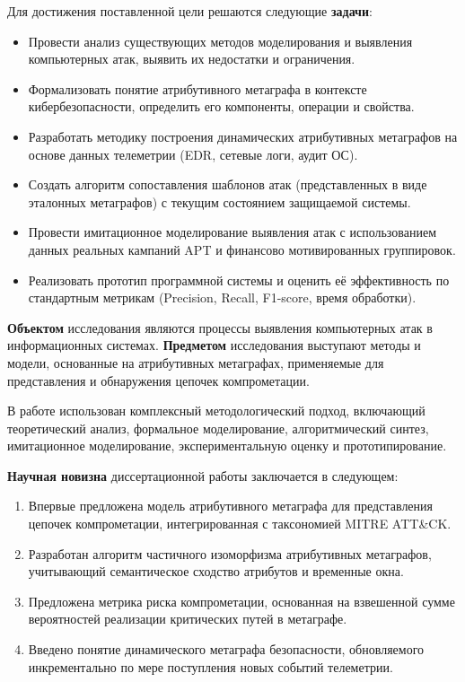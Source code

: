 Для достижения поставленной цели решаются следующие \textbf{задачи}:
\begin{itemize}
\item Провести анализ существующих методов моделирования и выявления компьютерных атак, выявить их недостатки и ограничения.
    \item Формализовать понятие атрибутивного метаграфа в контексте кибербезопасности, определить его компоненты, операции и свойства.
    \item Разработать методику построения динамических атрибутивных метаграфов на основе данных телеметрии (EDR, сетевые логи, аудит ОС).
    \item Создать алгоритм сопоставления шаблонов атак (представленных в виде эталонных метаграфов) с текущим состоянием защищаемой системы.
    \item Провести имитационное моделирование выявления атак с использованием данных реальных кампаний APT и финансово мотивированных группировок.
    \item Реализовать прототип программной системы и оценить её эффективность по стандартным метрикам (Precision, Recall, F1-score, время обработки).
\end{itemize}
\textbf{Объектом} исследования являются процессы выявления компьютерных атак в информационных системах.  
\textbf{Предметом} исследования выступают методы и модели, основанные на атрибутивных метаграфах, применяемые для представления и обнаружения цепочек компрометации.

В работе использован комплексный методологический подход, включающий теоретический анализ, формальное моделирование, алгоритмический синтез, имитационное моделирование, экспериментальную оценку и прототипирование.

\textbf{Научная новизна} диссертационной работы заключается в следующем:
\begin{enumerate}
    \item Впервые предложена модель атрибутивного метаграфа для представления цепочек компрометации, интегрированная с таксономией MITRE ATT\&CK.
    \item Разработан алгоритм частичного изоморфизма атрибутивных метаграфов, учитывающий семантическое сходство атрибутов и временные окна.
    \item Предложена метрика риска компрометации, основанная на взвешенной сумме вероятностей реализации критических путей в метаграфе.
    \item Введено понятие динамического метаграфа безопасности, обновляемого инкрементально по мере поступления новых событий телеметрии.
\end{enumerate}

